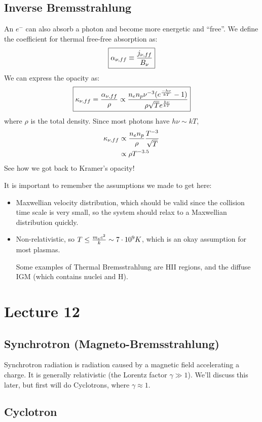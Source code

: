 \documentclass[11pt]{article}
\def\e#1{\cdot10^{#1}}
\begin{document}
\subsection*{ Inverse Bremsstrahlung}

An $e^-$ can also absorb a photon and become more energetic and ``free''.  We 
define the coefficient for thermal free-free absorption as:
\def\anff{\alpha_{\nu,ff}}
$$\boxed{\anff\equiv{\jnff\over B_\nu}}$$
We can express the opacity as:
\def\knff{\kappa_{\nu,ff}}
$$\boxed{\knff={\anff\over\rho}\propto{n_en_p\nu^{-3}(e^{-h\nu\over kT}-1)\over
\rho\sqrt{T}e^{h\nu\over kT}}}$$
where $\rho$ is the total density.  Since most photons have $h\nu\sim kT$,
$$\begin{aligned}\knff&\propto{n_en_p\over\rho}{T^{-3}\over\sqrt{T}}\\ 
&\propto\rho T^{-3.5}\\ \end{aligned}$$
See how we got back to Kramer's opacity!\par
It is important to remember the assumptions we made to get here:
\begin{itemize}
\item Maxwellian velocity distribution, which should be valid since the
collision time scale is very small, so the system should relax to a 
Maxwellian distribution quickly.
\item Non-relativistic, so $T\le{m_ec^2\over k}\sim7\e9K$, which
is an okay assumption for most plasmas.\par
Some examples of Thermal Bremsstrahlung are HII regions, and the diffuse
IGM (which contains nuclei and H).
\end{itemize}

\section*{ Lecture 12 }

\subsection*{ Synchrotron (Magneto-Bremsstrahlung)}

Synchrotron radiation is radiation caused by a magnetic field accelerating
a charge.  It is generally relativistic (the Lorentz factor $\gamma\gg1$).
We'll discuss this later, but first will do Cyclotrons, where $\gamma\approx1$.

\subsection*{ Cyclotron}
\end{document}
